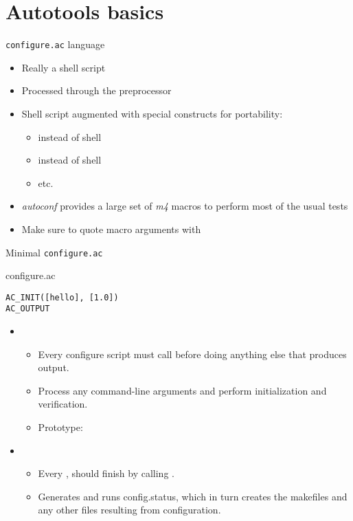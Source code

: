 
\section{Autotools basics}

\begin{frame}{{\tt configure.ac} language}
  \begin{itemize}
  \item Really a shell script
  \item Processed through the  preprocessor
  \item Shell script augmented with special constructs for portability:
    \begin{itemize}
    \item {} instead of shell 
    \item {} instead of shell 
    \item etc.
    \end{itemize}
  \item {\em autoconf} provides a large set of {\em m4} macros to
    perform most of the usual tests
  \item Make sure to quote macro arguments with \code{[]}
  \end{itemize}
\end{frame}

\begin{frame}[fragile]{Minimal {\tt configure.ac}}
  \begin{block}{configure.ac}
  \begin{verbatim}
AC_INIT([hello], [1.0])
AC_OUTPUT
  \end{verbatim}
  \end{block}
  \begin{itemize}
  \item {}
    \begin{itemize}
    \item Every configure script must call  before doing
      anything else that produces output.
    \item Process any command-line arguments and perform
      initialization and verification.
    \item Prototype:\\
    \end{itemize}
  \item {}
    \begin{itemize}
    \item Every , should finish by calling
      .
    \item Generates and runs config.status, which in turn creates the
      makefiles and any other files resulting from configuration.
    \end{itemize}
  \end{itemize}
\end{frame}

